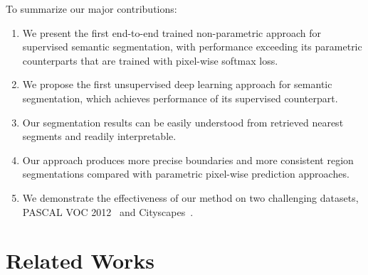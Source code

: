 \documentclass[10pt,twocolumn,letterpaper]{article}
\begin{document}
To summarize our major contributions:
\vspace{-6pt}
\begin{enumerate}
\setlength\itemsep{-2pt}

\item We present the first end-to-end trained non-parametric approach for supervised semantic segmentation, with performance exceeding its parametric counterparts that are trained with pixel-wise softmax loss.

\item We propose the first unsupervised deep learning approach for semantic segmentation, which achieves  performance of its supervised counterpart.

\item Our segmentation results can be easily understood from retrieved nearest segments and readily interpretable.

\item Our approach produces more precise boundaries and more consistent region segmentations compared with parametric pixel-wise prediction approaches.

\item We demonstrate the effectiveness of our method on two challenging datasets, PASCAL VOC 2012~\cite{pascal-voc-2012} and Cityscapes~\cite{cordts2016cityscapes}.


\end{enumerate}






 
\section{Related Works}
\label{sec:work}
\end{document}
